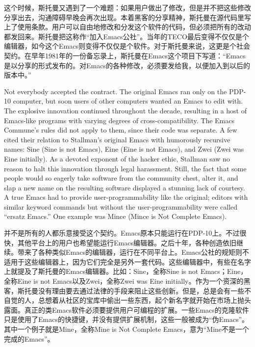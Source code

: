 \ifdefined\chs
这个时候，斯托曼又遇到了一个难题：如果用户做出了修改，但是并不把这些修改分享出去，沟通障碍早晚会再次出现。本着黑客的分享精神，斯托曼在源代码里写上了使用条款。用户可以自由地修改和分发这个软件的代码，但必须把所有的改动都发回来。斯托曼把这称作``加入Emacs公社''。当年的TECO最后变得不仅仅是个编辑器，如今这个Emacs则变得不仅仅是个软件。对于斯托曼来说，这更是个社会契约。在\ifdefined\vone 早年\fi\ifdefined\vtwo 1981年\fi 的一份备忘录上，斯托曼在Emacs这个项目下写道：``Emacs是以分享的形式发布的。对Emacs的各种修改，必须要发给我，以便加入到以后的版本中。''
\fi

\ifdefined\eng
\ifdefined\vone Not everybody accepted the contract. \fi\ifdefined\vtwo The original Emacs ran only on the PDP-10 computer, but soon users of other computers wanted an Emacs to edit with. \fi The explosive innovation continued throughout the decade, resulting in a host of Emacs-like programs with varying degrees of cross-compatibility. \ifdefined\vtwo The Emacs Commune's rules did not apply to them, since their code was separate. \fi A few cited their relation to Stallman's original Emacs with humorously recursive names: Sine (Sine is not Emacs), Eine (Eine is not Emacs), and Zwei (Zwei was Eine initially). \ifdefined\vone As a devoted exponent of the hacker ethic, Stallman saw no reason to halt this innovation through legal harassment. Still, the fact that some people would so eagerly take software from the community chest, alter it, and slap a new name on the resulting software displayed a stunning lack of courtesy. \fi\ifdefined\vtwo A true Emacs had to provide user-programmability like the original; editors with similar keyword commands but without the user-programmability were called ``ersatz Emacs.''  One example was Mince (Mince is Not Complete Emacs). \fi
\fi

\ifdefined\chs
\ifdefined\vone 并不是所有的人都乐意接受这个契约。\fi\ifdefined\vtwo Emacs原本只能运行在PDP-10上。不过很快，其他平台上的用户也希望能运行Emacs编辑器。\fi 之后十年，各种创造依旧继续。带来了各种类似Emacs的编辑器，运行在不同平台上。\ifdefined\vtwo Emacs公社的规矩则不适用于这些编辑器上，因为它们完全是另外一套代码。\fi 这些编辑器中，有些在名字上就提及了斯托曼的Emacs编辑器。比如：Sine，全称Sine is not Emacs；Eine，全称Eine is not Emacs以及Zwei，全称Zwei was Eine initially。\ifdefined\vone 作为一个资深的黑客，斯托曼没有理由要去通过法律的手段来阻止这些创新。但是，总是会有一些不自觉的人，总想着从社区的宝库中偷出一些东西，起个新名字就开始在市场上抛头露面。\fi\ifdefined\vtwo 真正的类Emacs软件必须要提供用户可编程的扩展。一些Emacs的克隆软件只是使用了Emacs的快捷键，并没有提供扩展机制，这些一般被成为``伪Emacs''。其中一个例子就是Mine，全称Mine is Not Complete Emacs，意为``Mine不是一个完成的Emacs''。\fi
\fi

